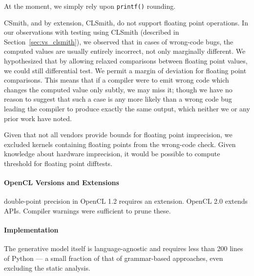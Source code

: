 At the moment, we simply rely upon \texttt{printf()} rounding.

CSmith, and by extension, CLSmith, do not support floating point operations. In our observations with testing using CLSmith (described in Section~\ref{sec:vs_clsmith}), we observed that in cases of wrong-code bugs, the computed values are usually entirely incorrect, not only marginally different. We hypothesized that by allowing relaxed comparisons between floating point values, we could still differential test. We permit a margin of deviation for floating point comparisons. This means that if a compiler were to emit wrong code which changes the computed value only subtly, we may miss it; though we have no reason to suggest that such a case is any more likely than a wrong code bug leading the compiler to produce exactly the same output, which neither we or any prior work have noted.

Given that not all vendors provide bounds for floating point imprecision, we excluded kernels containing floating points from the wrong-code check. Given knowledge about hardware imprecision, it would be possible to compute threshold for floating point difftests.

\paragraph{OpenCL Versions and Extensions} double-point precision in OpenCL 1.2 requires an extension. OpenCL 2.0 extends APIs. Compiler warnings were sufficient to prune these.

\paragraph{Implementation} The generative model itself is language-agnostic and requires less than 200 lines of Python --- a small fraction of that of grammar-based approaches, even excluding the static analysis.